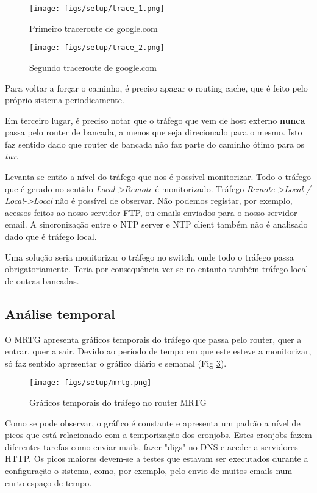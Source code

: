 \begin{figure}
    \centering
    \texttt{[image: figs/setup/trace\_1.png]}
    \caption{Primeiro traceroute de google.com}
    \label{fig:traceroute_1}
\end{figure}

\begin{figure}
    \centering
    \texttt{[image: figs/setup/trace\_2.png]}
    \caption{Segundo traceroute de google.com}
    \label{fig:traceroute_2}
\end{figure}

Para voltar a forçar o caminho, é preciso apagar o routing cache, que é feito pelo próprio sistema periodicamente.

Em terceiro lugar, é preciso notar que o tráfego que vem de host externo \textbf{nunca} passa pelo router de bancada, a menos que seja direcionado para o mesmo.
Isto faz sentido dado que router de bancada não faz parte do caminho ótimo para os \textit{tux}.

Levanta-se então a nível do tráfego que nos é possível monitorizar. 
Todo o tráfego que é gerado no sentido \textit{Local->Remote} é monitorizado.
Tráfego \textit{Remote->Local / Local->Local} não é possível de observar.
Não podemos registar, por exemplo, acessos feitos ao nosso servidor FTP, ou emails enviados para o nosso servidor email.
A sincronização entre o NTP server e NTP client também não é analisado dado que é tráfego local.

Uma solução seria monitorizar o tráfego no switch, onde todo o tráfego passa obrigatoriamente. Teria por consequência ver-se no entanto também tráfego local de outras bancadas.

\subsection{Análise temporal}

O MRTG apresenta gráficos temporais do tráfego que passa pelo router, quer a entrar, quer a sair.
Devido ao período de tempo em que este esteve a monitorizar, só faz sentido apresentar o gráfico diário e semanal (Fig \ref{fig:mrtg_main}).

\begin{figure}
    \centering
    \texttt{[image: figs/setup/mrtg.png]}
    \caption{Gráficos temporais do tráfego no router MRTG}
    \label{fig:mrtg_main}
\end{figure}

Como se pode observar, o gráfico é constante e apresenta um padrão a nível de picos que está relacionado com a temporização dos cronjobs.
Estes cronjobs fazem diferentes tarefas como enviar mails, fazer "digs" no DNS e aceder a servidores HTTP.
Os picos maiores devem-se a testes que estavam ser executados durante a configuração o sistema, como, por exemplo, pelo envio de muitos emails num curto espaço de tempo.

